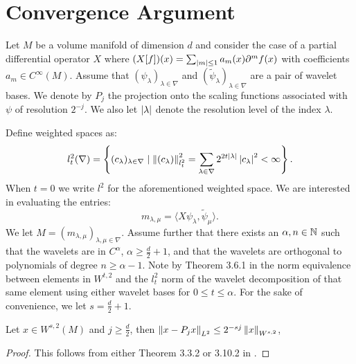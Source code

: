 \section{Convergence Argument}

Let $M$ be a volume manifold of dimension $d$ and consider the case of a partial differential operator $X$ where $(X [f] )(x) = \sum_{\left| m \right|\leq 1} a_m(x) \partial^m f(x)$ with coefficients $a_m \in C^{\infty}(M)$. Assume that $(\psi_\lambda)_{\lambda \in \nabla}$ and $(\tilde{\psi}_\lambda)_{\lambda \in \nabla}$ are a pair of wavelet bases. We denote by $P_j$ the projection onto the scaling functions associated with $\psi$ of resolution $2^{-j}$. We also let ${\lvert\lambda\rvert}$ denote the resolution level of the index $\lambda$. 

Define weighted spaces as:
\begin{equation}
	l_t^2(\nabla) = \left\{ (c_\lambda)_{\lambda\in\nabla} \mid \left\| (c_\lambda) \right\|_{l^2_t}^2 = \sum_{\lambda \in \nabla} 2^{2t{\lvert\lambda\rvert}}\left| c_\lambda \right|^2 < \infty  \right\}.
\end{equation}
When $t = 0$ we write $l^2$ for the aforementioned weighted space. We are interested in evaluating the entries:
\begin{equation}
	m_{\lambda,\mu} = \langle X \psi_\lambda, \tilde{\psi}_\mu \rangle.
\end{equation}
We let $M=(m_{\lambda,\mu})_{\lambda,\mu \in \nabla}$. Assume further that there exists an $\alpha,n \in \mathbb{N}$ such that the wavelets are in $C^{\alpha}$, $\alpha \geq \frac{d}{2} + 1$, and that the wavelets are orthogonal to polynomials of degree $n \geq \alpha - 1$.  Note by Theorem 3.6.1 in \cite{Cohen2003} the norm equivalence between elements in $W^{t,2}$ and the $l_t^2$ norm of the wavelet decomposition of that same element using either wavelet bases for $0\leq t \leq \alpha$. For the sake of convenience, we let $s = \frac{d}{2} + 1$. 

\begin{lemma} \label{lem:projection_bound}
	Let $x \in W^{s,2}(M)$ and $j \geq \frac{d}{2}$, then $\left\| x - P_j x \right\|_{L^2} \leq  2^{-sj}\left\| x \right\|_{W^{s,2}}$,
\end{lemma}
\begin{proof}
	This follows from either Theorem 3.3.2 or 3.10.2 in \cite{}.
\end{proof}

